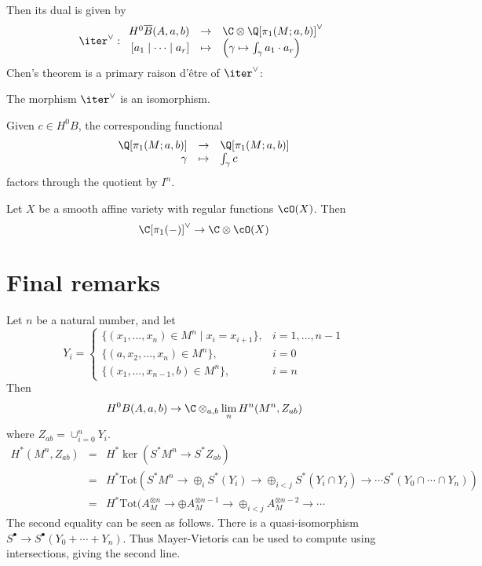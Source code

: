 Then its dual is given by
\[
\iter^{\vee} : \begin{array}{rcl}
H^0 \overline{B}(A, a, b) & \to & \C \otimes \Q[\pi_1(M; a, b)]^{\vee} \\
\textrm{$[a_1 \mid \cdots \mid a_r]$} & \mapsto & \left( \gamma \mapsto \int_{\gamma} a_1 \cdot a_r \right)
\end{array}
\]
Chen's theorem is a primary raison d'\^etre of $\iter^{\vee}$:
\begin{thm}[Chen]
The morphism $\iter^{\vee}$ is an isomorphism.
\end{thm}

Given $c \in H^0B$, the corresponding functional 
\[
\begin{array}{rcl}
\Q[\pi_1(M; a, b)] & \to & \Q[\pi_1(M; a, b)] \\
\gamma & \mapsto & \int_{\gamma} c
\end{array}
\]
factors through the quotient by $I^n$.

Let $X$ be a smooth affine variety with regular functions $\cO(X)$. Then
\[
\C[\pi_1(-)]^{\vee} \to \C \otimes \cO(X)
\]

\section{Final remarks}
Let $n$ be a natural number, and let
\[
Y_i = \left\{ \begin{array}{ll}
\{ (x_1, \ldots, x_n) \in M^n \mid x_i = x_{i+1} \}, & i = 1, \ldots, n-1 \\
\{ (a, x_2, \ldots, x_n) \in M^n \}, & i =0 \\
\{ (x_1, \ldots, x_{n-1}, b) \in M^n \}, & i = n
\end{array} \right.
\]
Then
\[
H^0 B(A, a, b) \to \C \otimes_{a, b} \lim_n H^n(M^n, Z_{ab})
\]
where $Z_{ab} = \cup_{i=0}^n Y_i$. 
\[
\begin{array}{rcl}
H^*(M^n, Z_{ab}) & = & H^* \ker(S^* M^n \to S^* Z_{ab}) \\
& = & H^* \textrm{Tot}(S^* M^n \to \oplus_i S^*(Y_i) \to \oplus_{i < j} S^*(Y_i \cap Y_j) \to \cdots S^*(Y_0 \cap \cdots \cap Y_n)) \\
& = & H^* \textrm{Tot}(A_M^{\otimes n} \to \oplus A_M^{\otimes n-1} \to \oplus_{i < j} A_M^{\otimes n-2} \to \cdots
\end{array}
\]
The second equality can be seen as follows. There is a quasi-isomorphism $S^{\bullet} \to S^{\bullet}(Y_0 + \cdots + Y_n)$. Thus Mayer-Vietoris can be used to compute using intersections, giving the second line.

